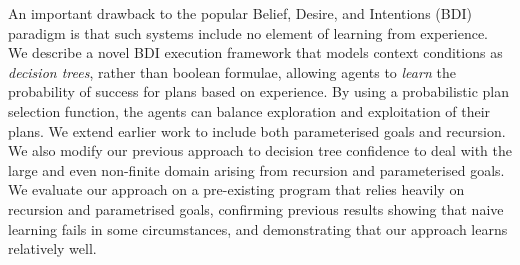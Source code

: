 An important drawback to the popular Belief, Desire, and Intentions (BDI)
paradigm is that such systems include no element of learning from experience.
We describe a novel BDI execution framework that models
context conditions as \emph{decision trees}, rather than boolean
formulae, allowing
agents to \emph{learn} the probability of success for plans based on
experience. By using a probabilistic plan selection function, the
agents can balance exploration and exploitation of their plans.
We extend earlier work to include both parameterised goals and
recursion. We also modify our previous approach to decision tree
confidence to deal with the large and even non-finite domain arising
from recursion and parameterised goals. 
We evaluate our approach on a pre-existing program that relies heavily
on recursion and parametrised goals, confirming previous results
showing that naive learning fails in some circumstances, and
demonstrating that our approach learns relatively well.

